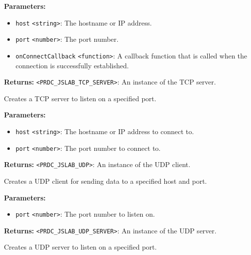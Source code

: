 \documentclass[12pt,a4paper]{article}
\begin{document}
\noindent \textbf{Parameters:}
\begin{itemize}
  \item \texttt{host} \texttt{<string>}: The hostname or IP address.
  \item \texttt{port} \texttt{<number>}: The port number.
  \item \texttt{onConnectCallback} \texttt{<function>}: A callback function that is called when the connection is successfully established.
\end{itemize}

\noindent \textbf{Returns:} \texttt{<PRDC\_JSLAB\_TCP\_SERVER>}: An instance of the TCP server.

\noindent Creates a TCP server to listen on a specified port.

\vspace{5mm}
\noindent {}


\noindent \textbf{Parameters:}
\begin{itemize}
  \item \texttt{host} \texttt{<string>}: The hostname or IP address to connect to.
  \item \texttt{port} \texttt{<number>}: The port number to connect to.
\end{itemize}

\noindent \textbf{Returns:} \texttt{<PRDC\_JSLAB\_UDP>}: An instance of the UDP client.

\noindent Creates a UDP client for sending data to a specified host and port.

\vspace{5mm}
\noindent {}


\noindent \textbf{Parameters:}
\begin{itemize}
  \item \texttt{port} \texttt{<number>}: The port number to listen on.
\end{itemize}

\noindent \textbf{Returns:} \texttt{<PRDC\_JSLAB\_UDP\_SERVER>}: An instance of the UDP server.

\noindent Creates a UDP server to listen on a specified port.

\vspace{5mm}
\noindent {}
\end{document}
